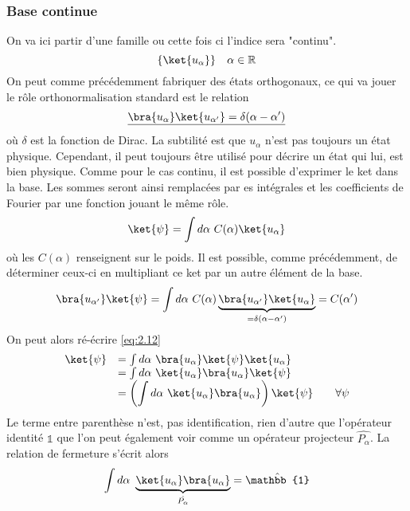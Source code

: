 \subsubsection{Base continue}
On va ici partir d'une famille ou cette fois ci l'indice sera "continu". 
\begin{equation}
\{\ket{u_\alpha}\}\quad \alpha\in\mathbb{R}
\end{equation}
On peut comme précédemment fabriquer des états orthogonaux, ce qui va jouer 
le rôle orthonormalisation standard est le relation
\begin{equation}
\underline{\bra{u_\alpha}\ket{u_{\alpha'}} = \delta(\alpha-\alpha')}
\end{equation}
où $\delta$ est la fonction de Dirac. La subtilité est que $u_\alpha$ n'est 
pas toujours un état physique. Cependant, il peut toujours être utilisé pour 
décrire un état qui lui, est bien physique. Comme pour le cas continu, il 
est possible d'exprimer le ket dans la base. Les sommes seront ainsi 
remplacées par es intégrales et les coefficients de Fourier par une fonction 
jouant le même rôle.
\begin{equation}
\ket{\psi} = \int d\alpha\ C(\alpha)\ket{u_\alpha}
\label{eq:2.12}
\end{equation}
où les $C(\alpha)$ renseignent sur le poids. Il est possible, comme précédemment, 
de déterminer ceux-ci en multipliant ce ket par un autre élément de la base.
\begin{equation}
\bra{u_{\alpha'}}\ket{\psi} = \int d\alpha\ C(\alpha) \underbrace{
\bra{u_{\alpha'}}\ket{u_\alpha}}_{=\delta(\alpha-\alpha')} = C(\alpha')
\end{equation}
On peut alors ré-écrire \autoref{eq:2.12}
\begin{equation}
\begin{array}{ll}
\ket{\psi} &= \int d\alpha\ \bra{u_\alpha}\ket{\psi}\ket{u_\alpha}\\
&= \int d\alpha\ \ket{u_\alpha}\bra{u_\alpha}\ket{\psi}\\
&=\displaystyle\left(\int d\alpha\ \ket{u_\alpha}\bra{u_\alpha}\right)\ket{\psi}
\qquad \forall\psi
\end{array}
\end{equation}
Le terme entre parenthèse n'est, pas identification, rien d'autre que l'opérateur 
identité $\mathbb{1}$ que l'on peut également voir comme un opérateur projecteur
$\hat{P_\alpha}$. La relation de fermeture s'écrit alors
\begin{equation}
\int d\alpha\ \underbrace{\ket{u_\alpha}\bra{u_\alpha}}_{\hat{P_\alpha}} = \hat{
\mathbb{1}}
\end{equation}
